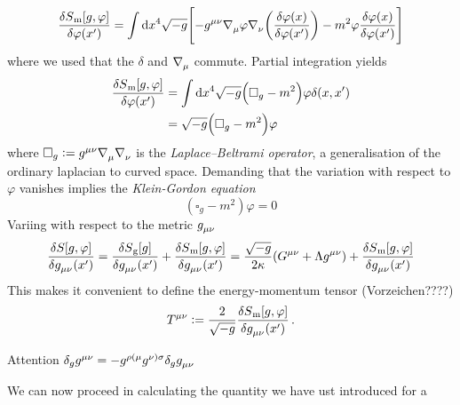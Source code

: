 \begin{equation}
\frac{\delta S\textsubscript{m}[g,\varphi]}{\delta \varphi\left(x'\right)}=\int
\dif x^4\sqrt{-g}\left[-\tensor{g}{^\mu^\nu}
\tensor{\nabla}{_\mu}\varphi\tensor{\nabla}{_\nu}\left(\frac{\delta
\varphi(x)}{\delta \varphi\left(x'\right)}\right)-m^2\varphi\frac{\delta
\varphi(x)}{\delta \varphi\left(x'\right)}\right]
\end{equation}
where we used that the $\delta$ and $\tensor{\nabla}{_\mu}$ commute. Partial
integration yields
\begin{equation}
\begin{split}
\frac{\delta S\textsubscript{m}[g,\varphi]}{\delta \varphi\left(x'\right)}&=\int
\dif
x^4\sqrt{-g}\left(\square_{g}-m^2\right)\varphi\delta(x,x')\\
&=\sqrt{-g}\left(\square_{g}-m^2\right)\varphi
\end{split}
\end{equation}
where $\square_{g}:=\tensor{g}{^\mu^\nu}
\tensor{\nabla}{_\mu}\tensor{\nabla}{_\nu} $ is the
\emph{Laplace–Beltrami operator}, a generalisation of the ordinary laplacian to
curved space.
Demanding that the variation with respect to $\varphi$ vanishes implies the
\emph{Klein-Gordon equation}
\begin{equation}
\left(\square_g-m^2\right)\varphi=0
\end{equation}
Variing with respect to the metric $\tensor{g}{_\mu_\nu}$
\begin{equation}
\frac{\delta S[g,\varphi]}{\delta
\tensor{g}{_\mu_\nu}\left(x'\right)}=
\frac{\delta S\textsubscript{g}[g]}{\delta
\tensor{g}{_\mu_\nu}\left(x'\right)}
+\frac{\delta S\textsubscript{m}[g,\varphi]}{\delta
\tensor{g}{_\mu_\nu}\left(x'\right)}
=\frac{\sqrt{-g}}{2\kappa}\left(\tensor{G}{^\mu^\nu}+\Lambda\tensor{g}{^\mu^\nu}
\right)+\frac{\delta S\textsubscript{m}[g,\varphi]}{\delta
\tensor{g}{_\mu_\nu}\left(x'\right)}
\end{equation}
This makes it convenient to define the energy-momentum tensor (Vorzeichen????)
\begin{equation}
\tensor{T}{^\mu^\nu}:=\frac{2}{\sqrt{-g}}\frac{\delta
S\textsubscript{m}[g,\varphi]}{\delta \tensor{g}{_\mu_\nu}\left(x'\right)}\,.
\end{equation}
\begin{remark}
Attention $\delta_g
\tensor{g}{^\mu^\nu}=-\tensor{g}{^\rho^{(\mu}}\tensor{g}{^{\nu)}^\sigma}\delta_g
\tensor{g}{_\mu_\nu}$
\end{remark}
We can now proceed in calculating the quantity we have ust introduced for a
